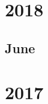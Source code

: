 \documentclass[12pt]{article}
\begin{document}







\section{2018}
\subsection{June}
\begin{refsection}
    \nocite{radford_improving_nodate}
    \printbibliography[heading=none]
\end{refsection}


\section{2017}
\begin{refsection}
    \nocite{vaswani2023attentionneed}
    \printbibliography[heading=none]
\end{refsection}
\end{document}
